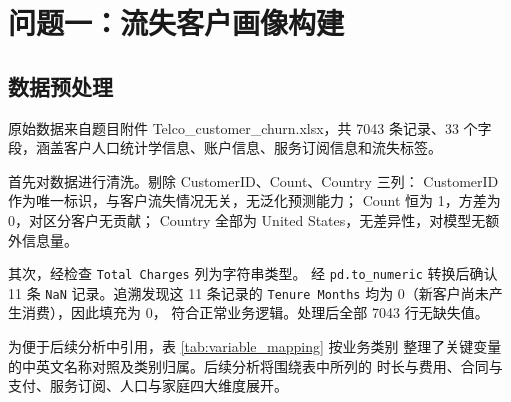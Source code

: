 \section{问题一：流失客户画像构建}

\subsection{数据预处理}

原始数据来自题目附件 Telco\_customer\_churn.xlsx，共 7043 条记录、33 个字段，涵盖客户人口统计学信息、账户信息、服务订阅信息和流失标签。

首先对数据进行清洗。剔除 CustomerID、Count、Country 三列：
CustomerID 作为唯一标识，与客户流失情况无关，无泛化预测能力；
Count 恒为 1，方差为 0，对区分客户无贡献；
Country 全部为 United States，无差异性，对模型无额外信息量。

其次，经检查 \texttt{Total Charges} 列为字符串类型。
经 \texttt{pd.to\_numeric}
转换后确认 11 条 \texttt{NaN} 记录。追溯发现这 11 条记录的
\texttt{Tenure Months} 均为 0（新客户尚未产生消费），因此填充为 0，
符合正常业务逻辑。处理后全部 7043 行无缺失值。

为便于后续分析中引用，表 \ref{tab:variable_mapping} 按业务类别
整理了关键变量的中英文名称对照及类别归属。后续分析将围绕表中所列的
时长与费用、合同与支付、服务订阅、人口与家庭四大维度展开。

